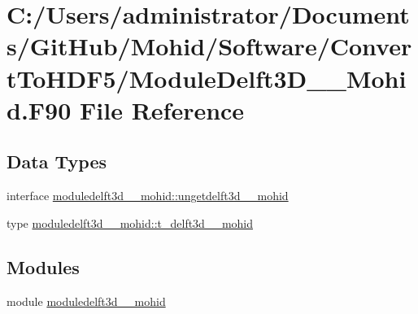 \hypertarget{_module_delft3_d__2___mohid_8_f90}{}\section{C\+:/\+Users/administrator/\+Documents/\+Git\+Hub/\+Mohid/\+Software/\+Convert\+To\+H\+D\+F5/\+Module\+Delft3\+D\+\_\+\_\+\+Mohid.F90 File Reference}
\label{_module_delft3_d__2___mohid_8_f90}
\subsection*{Data Types}
\begin{DoxyCompactItemize}
\item 
interface \mbox{\hyperlink{interfacemoduledelft3d__2__mohid_1_1ungetdelft3d__2__mohid}{moduledelft3d\+\_\+\_\+mohid\+::ungetdelft3d\+\_\+\_\+mohid}}
\item 
type \mbox{\hyperlink{structmoduledelft3d__2__mohid_1_1t__delft3d__2__mohid}{moduledelft3d\+\_\+\_\+mohid\+::t\+\_\+delft3d\+\_\+\_\+mohid}}
\end{DoxyCompactItemize}
\subsection*{Modules}
\begin{DoxyCompactItemize}
\item 
module \mbox{\hyperlink{namespacemoduledelft3d__2__mohid}{moduledelft3d\+\_\+\_\+mohid}}
\end{DoxyCompactItemize}
